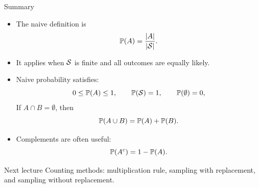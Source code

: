 \begin{frame}{Summary}
\begin{itemize}
    \item The naive definition is
    \[
    \mathbb{P}(A)=\frac{|A|}{|\mathcal{S}|}.
    \]

    \item It applies when $\mathcal{S}$ is finite and all outcomes are equally likely.

    \item Naive probability satisfies:
    \[
    0 \leq \mathbb{P}(A) \leq 1,
    \qquad
    \mathbb{P}(\mathcal{S})=1,
    \qquad
    \mathbb{P}(\emptyset)=0,
    \]
 If $A \cap B=\emptyset$, then
    \[
    \mathbb{P}(A \cup B)=\mathbb{P}(A)+\mathbb{P}(B).
    \]

    \item Complements are often useful:
    \[
    \mathbb{P}(A^c)=1-\mathbb{P}(A).
    \]
\end{itemize}

\begin{keybox}{Next lecture}
Counting methods: multiplication rule, sampling with replacement, and sampling without replacement.
\end{keybox}
\end{frame}